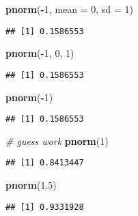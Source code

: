 \documentclass[]{article}
\newenvironment{Shaded}{\begin{snugshade}}{\end{snugshade}}
\newcommand{\CommentTok}[1]{\textcolor[rgb]{0.56,0.35,0.01}{\textit{#1}}}
\newcommand{\DataTypeTok}[1]{\textcolor[rgb]{0.13,0.29,0.53}{#1}}
\newcommand{\DecValTok}[1]{\textcolor[rgb]{0.00,0.00,0.81}{#1}}
\newcommand{\FloatTok}[1]{\textcolor[rgb]{0.00,0.00,0.81}{#1}}
\newcommand{\KeywordTok}[1]{\textcolor[rgb]{0.13,0.29,0.53}{\textbf{#1}}}
\newcommand{\NormalTok}[1]{#1}
\newcommand{\OperatorTok}[1]{\textcolor[rgb]{0.81,0.36,0.00}{\textbf{#1}}}
\begin{document}
\begin{Shaded}
\begin{Highlighting}[]
\KeywordTok{pnorm}\NormalTok{(}\OperatorTok{-}\DecValTok{1}\NormalTok{, }\DataTypeTok{mean =} \DecValTok{0}\NormalTok{, }\DataTypeTok{sd =} \DecValTok{1}\NormalTok{)}
\end{Highlighting}
\end{Shaded}

\begin{verbatim}
## [1] 0.1586553
\end{verbatim}

\begin{Shaded}
\begin{Highlighting}[]
\KeywordTok{pnorm}\NormalTok{(}\OperatorTok{-}\DecValTok{1}\NormalTok{, }\DecValTok{0}\NormalTok{, }\DecValTok{1}\NormalTok{)}
\end{Highlighting}
\end{Shaded}

\begin{verbatim}
## [1] 0.1586553
\end{verbatim}

\begin{Shaded}
\begin{Highlighting}[]
\KeywordTok{pnorm}\NormalTok{(}\OperatorTok{-}\DecValTok{1}\NormalTok{)}
\end{Highlighting}
\end{Shaded}

\begin{verbatim}
## [1] 0.1586553
\end{verbatim}

\begin{Shaded}
\begin{Highlighting}[]
\CommentTok{# guess work}
\KeywordTok{pnorm}\NormalTok{(}\DecValTok{1}\NormalTok{)}
\end{Highlighting}
\end{Shaded}

\begin{verbatim}
## [1] 0.8413447
\end{verbatim}

\begin{Shaded}
\begin{Highlighting}[]
\KeywordTok{pnorm}\NormalTok{(}\FloatTok{1.5}\NormalTok{)}
\end{Highlighting}
\end{Shaded}

\begin{verbatim}
## [1] 0.9331928
\end{verbatim}
\end{document}
